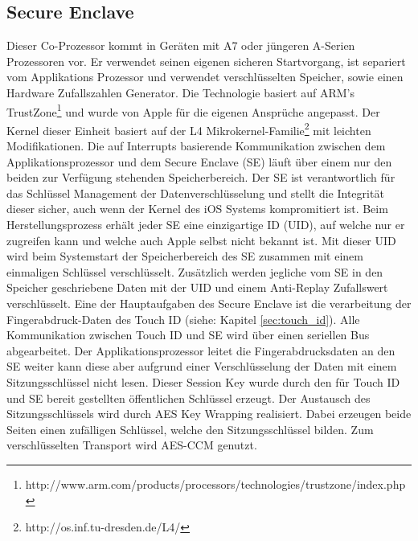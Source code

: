 	\subsection{Secure Enclave}\label{sec:secure_enclave}
		Dieser Co-Prozessor kommt in Geräten mit A7 oder jüngeren A-Serien Prozessoren
		vor. Er verwendet seinen eigenen sicheren Startvorgang, ist separiert vom
		Applikations Prozessor und verwendet verschlüsselten Speicher, sowie einen
		Hardware Zufallszahlen Generator. Die Technologie basiert auf ARM's
		TrustZone\footnote{http://www.arm.com/products/processors/technologies/trustzone/index.php}
		und wurde von Apple für die eigenen Ansprüche angepasst. Der Kernel dieser
		Einheit basiert auf der L4
		Mikrokernel-Familie\footnote{http://os.inf.tu-dresden.de/L4/} mit leichten
		Modifikationen. Die auf Interrupts basierende Kommunikation zwischen dem Applikationsprozessor und dem Secure Enclave (SE) läuft über
		einem nur den beiden zur Verfügung stehenden Speicherbereich. Der SE ist
		verantwortlich für das Schlüssel Management der Datenverschlüsselung und
		stellt die Integrität dieser sicher, auch wenn der Kernel des iOS Systems
		kompromitiert ist. Beim Herstellungsprozess erhält jeder SE eine einzigartige
		ID (UID), auf welche nur er zugreifen kann und welche auch Apple selbst nicht
		bekannt ist. Mit dieser UID wird beim Systemstart der Speicherbereich des SE
		zusammen mit einem einmaligen Schlüssel verschlüsselt. Zusätzlich werden
		jegliche vom SE in den Speicher geschriebene Daten mit der UID und einem
		Anti-Replay Zufallswert verschlüsselt. Eine der Hauptaufgaben des Secure
		Enclave ist die verarbeitung der Fingerabdruck-Daten des Touch
		ID (siehe: Kapitel \ref{sec:touch_id}). Alle Kommunikation zwischen Touch ID
		und SE wird über einen seriellen Bus abgearbeitet. Der Applikationsprozessor leitet die Fingerabdrucksdaten an den
		SE weiter kann diese aber aufgrund einer Verschlüsselung der Daten mit einem
		Sitzungsschlüssel nicht lesen. Dieser Session Key wurde durch den für Touch ID
		und SE bereit gestellten öffentlichen Schlüssel erzeugt. Der Austausch des
		Sitzungsschlüssels wird durch AES Key Wrapping realisiert. Dabei erzeugen
		beide Seiten einen zufälligen Schlüssel, welche den Sitzungsschlüssel bilden.
		Zum verschlüsselten Transport wird AES-CCM genutzt.

